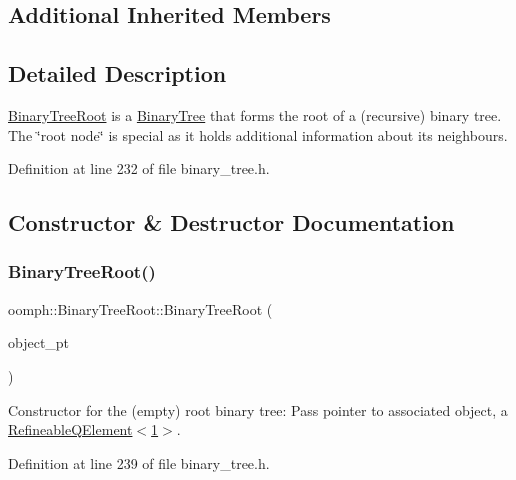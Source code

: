 \subsection*{Additional Inherited Members}


\subsection{Detailed Description}
\hyperlink{classoomph_1_1BinaryTreeRoot}{Binary\+Tree\+Root} is a \hyperlink{classoomph_1_1BinaryTree}{Binary\+Tree} that forms the root of a (recursive) binary tree. The \char`\"{}root node\char`\"{} is special as it holds additional information about its neighbours. 

Definition at line 232 of file binary\+\_\+tree.\+h.



\subsection{Constructor \& Destructor Documentation}
\mbox{\label{classoomph_1_1BinaryTreeRoot_a0041d849b67407699770118eaa06b52a}} 
\subsubsection{\texorpdfstring{Binary\+Tree\+Root()}{BinaryTreeRoot()}\hspace{0.1cm}{\footnotesize\ttfamily [1/2]}}
{\footnotesize\ttfamily oomph\+::\+Binary\+Tree\+Root\+::\+Binary\+Tree\+Root (\begin{DoxyParamCaption}\item[{\hyperlink{classoomph_1_1RefineableElement}{Refineable\+Element} $\ast$const \&}]{object\+\_\+pt }\end{DoxyParamCaption})\hspace{0.3cm}{\ttfamily [inline]}}

Constructor for the (empty) root binary tree\+: Pass pointer to associated object, a \hyperlink{classoomph_1_1RefineableQElement_3_011_01_4}{Refineable\+Q\+Element$<$1$>$}. 

Definition at line 239 of file binary\+\_\+tree.\+h.



